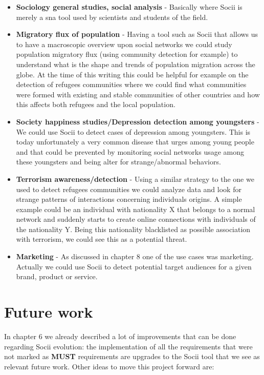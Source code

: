 \begin{itemize}
    \item \textbf{Sociology general studies, social analysis} - Basically where Socii is merely a \gls{sna} tool used by scientists and students of the field.
    \item \textbf{Migratory flux of population} - Having a tool such as Socii that allows us to have a macroscopic overview upon social networks we could study population migratory flux (using community detection for example) to understand what is the shape and trends of population migration across the globe. At the time of this writing this could be helpful for example on the detection of refugees communities where we could find what communities were formed with existing and stable communities of other countries and how this affects both refugees and the local population.
    \item \textbf{Society happiness studies/Depression detection among youngsters} - We could use Socii to detect cases of depression among youngsters. This is today unfortunately a very common disease that urges among young people and that could be prevented by monitoring social networks usage among these youngsters and being alter
    for strange/abnormal behaviors.
    \item \textbf{Terrorism awareness/detection} - Using a similar strategy to the one we used to detect refugees communities we could analyze data and look for strange patterns of interactions concerning individuals origins. A simple example could be an individual with nationality X that belongs to a normal network and suddenly starts to create online connections with individuals of the nationality Y. Being this nationality blacklisted as possible association with terrorism, we could see this as a potential threat.
    \item \textbf{Marketing} - As discussed in chapter 8 one of the use cases was marketing. Actually we could use Socii to detect potential target audiences for a given brand, product or service.
\end{itemize}

\section{Future work}
In chapter 6 we already described a lot of improvements that can be done regarding Socii evolution: the implementation of all the requirements that were not marked as \textbf{MUST} requirements are upgrades to the Socii tool that we see as relevant future work. Other ideas to move this project forward are:

